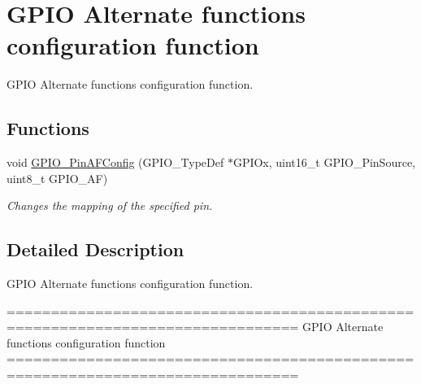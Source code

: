 \hypertarget{group___g_p_i_o___group3}{\section{G\-P\-I\-O Alternate functions configuration function}
\label{group___g_p_i_o___group3}
}


G\-P\-I\-O Alternate functions configuration function.  


\subsection*{Functions}
\begin{DoxyCompactItemize}
\item 
void \hyperlink{group___g_p_i_o___group3_ga0a77617a322562ae84f8d72486032c5d}{G\-P\-I\-O\-\_\-\-Pin\-A\-F\-Config} (G\-P\-I\-O\-\_\-\-Type\-Def $\ast$G\-P\-I\-Ox, uint16\-\_\-t G\-P\-I\-O\-\_\-\-Pin\-Source, uint8\-\_\-t G\-P\-I\-O\-\_\-\-A\-F)
\begin{DoxyCompactList}\small\item\em Changes the mapping of the specified pin. \end{DoxyCompactList}\end{DoxyCompactItemize}


\subsection{Detailed Description}
G\-P\-I\-O Alternate functions configuration function. \begin{DoxyVerb} ===============================================================================
               GPIO Alternate functions configuration function
 ===============================================================================  \end{DoxyVerb}
 

